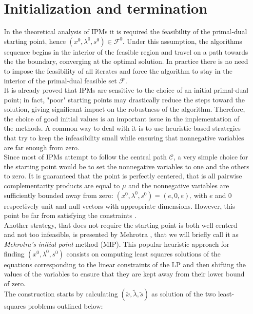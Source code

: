 \documentclass[a4paper,10 pt,titlepage,twoside]{book}
\theoremstyle{plain}
\theoremstyle{definition}
\theoremstyle{remark}
\begin{document}
{{\section*{Initialization and termination}
In the theoretical analysis of IPMs it is required the feasibility of the primal-dual starting point, hence $(x^{0}, \lambda^{0}, s^{0})\in\mathcal{F}^{0}$. Under this assumption, the algorithms sequence begins in the interior of the feasible region and travel on
a path towards the the boundary, converging at the optimal solution. In practice there is no need to impose the feasibility of all iterates and force the algorithm to stay in the interior of the primal-dual feasible set $\mathcal{F}$.\\
It is already proved that IPMs are sensitive to the choice of an initial primal-dual point; in fact, "poor" starting points may drastically reduce the steps toward the solution, giving significant impact on the robustness of the algorithm. Therefore, the choice of good initial values is an important issue in the implementation of the methods. A common way to deal with it is to use heuristic-based strategies that try to keep the infeasibility small while ensuring that nonnegative variables are far enough from zero.\\
Since most of IPMs attempt to follow the central path $\mathcal{C}$, a very simple choice for the starting point would be to set the nonnegative variables to one and the others to zero. It is guaranteed that the point is perfectly centered, that is all pairwise complementarity products are equal to $\mu$ and the nonnegative variables are sufficiently bounded away from zero: $(x^{0},\lambda^{0},s^{0})=(e, 0, e)$, with $e$ and $0$ respectively unit and null vectors with appropriate dimensions. However, this point be far from satisfying the constraints \cite{VAN}.\\
Another strategy, that does not require the starting point is both well centerd and not too infeasible, is presented by Mehrotra \cite{MER}, that we will briefly call it as \textit{Mehrotra's initial point} method (MIP). This popular heuristic approach for finding $(x^{0}, \lambda^{0}, s^{0})$ consists on computing least squares solutions of the equations corresponding to the linear constraints of the LP and then shifting the values of the variables to ensure that they are kept away from their lower bound of zero. \\
The construction starts by calculating $(\tilde{x}, \tilde{\lambda}, \tilde{s})$ as solution of the two least-squares problems outlined below:
}}
\end{document}
